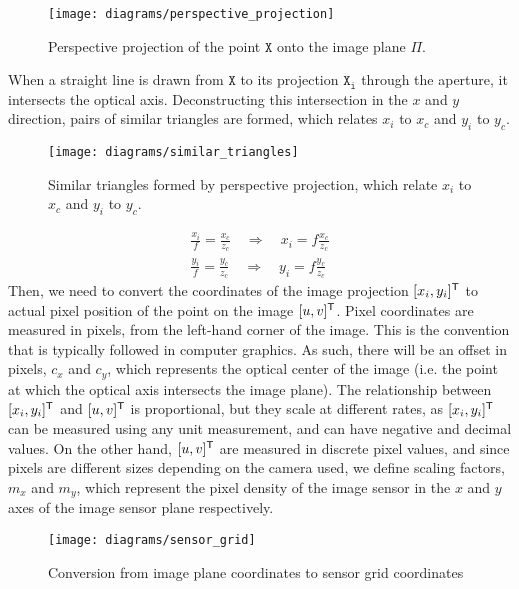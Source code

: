 \begin{figure}[H]
    \centering
    \texttt{[image: diagrams/perspective\_projection]}
    \caption{Perspective projection of the point $\mathtt{X}$ onto the image plane $\Pi$.}
\end{figure}
When a straight line is drawn from $\mathtt{X}$ to its projection $\mathtt{X_i}$ through the aperture, it intersects the optical axis. Deconstructing this intersection in the $x$ and $y$ direction, pairs of similar triangles are formed, which relates $x_i$ to $x_c$ and $y_i$ to $y_c$.
\begin{figure}[H]
    \centering
    \texttt{[image: diagrams/similar\_triangles]}
    \caption{Similar triangles formed by perspective projection, which relate $x_i$ to $x_c$ and $y_i$ to $y_c$.} \label{fig:similar_triangles}
\end{figure}
\begin{subequations}
    \begin{gather}
        \frac{x_i}{f} = \frac{x_c}{z_c} \quad \Longrightarrow \quad x_i = f \frac{x_c}{z_c} \label{subeq:xi_result}\\
        \frac{y_i}{f} = \frac{y_c}{z_c} \quad \Longrightarrow \quad y_i = f \frac{y_c}{z_c} \label{subeq:yi_result}
    \end{gather}
\end{subequations}
Then, we need to convert the coordinates of the image projection $[x_i, y_i]^{\mathsf{T}}$ to actual pixel position of the point on the image $[u, v]^{\mathsf{T}}$. Pixel coordinates are measured in pixels, from the left-hand corner of the image. This is the convention that is typically followed in computer graphics. As such, there will be an offset in pixels, $c_x$ and $c_y$, which represents the optical center of the image (i.e. the point at which the optical axis intersects the image plane). The relationship between $[x_i, y_i]^{\mathsf{T}}$ and $[u, v]^{\mathsf{T}}$ is proportional, but they scale at different rates, as $[x_i, y_i]^{\mathsf{T}}$ can be measured using any unit measurement, and can have negative and decimal values. On the other hand, $[u,v]^{\mathsf{T}}$ are measured in discrete pixel values, and since pixels are different sizes depending on the camera used, we define scaling factors, $m_x$ and $m_y$, which represent the pixel density of the image sensor in the $x$ and $y$ axes of the image sensor plane respectively.
\begin{figure}[H]
    \centering
    \texttt{[image: diagrams/sensor\_grid]}
    \caption{Conversion from image plane coordinates to sensor grid coordinates}
\end{figure}
